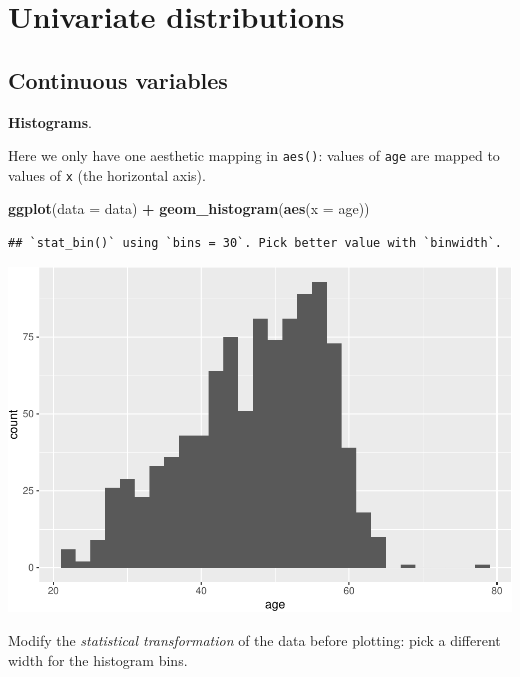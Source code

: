 \documentclass[
]{book}
\newenvironment{Shaded}{\begin{snugshade}}{\end{snugshade}}
\newcommand{\AttributeTok}[1]{\textcolor[rgb]{0.13,0.29,0.53}{#1}}
\newcommand{\FunctionTok}[1]{\textcolor[rgb]{0.13,0.29,0.53}{\textbf{#1}}}
\newcommand{\NormalTok}[1]{#1}
\newcommand{\SpecialCharTok}[1]{\textcolor[rgb]{0.81,0.36,0.00}{\textbf{#1}}}
\begin{document}
\hypertarget{univariate-distributions}{%
\section{Univariate distributions}\label{univariate-distributions}}

\hypertarget{continuous-variables}{%
\subsection{Continuous variables}\label{continuous-variables}}

\textbf{Histograms}.

Here we only have one aesthetic mapping in \texttt{aes()}: values of \texttt{age} are mapped to values of \texttt{x} (the horizontal axis).

\begin{Shaded}
\begin{Highlighting}[]
\FunctionTok{ggplot}\NormalTok{(}\AttributeTok{data =}\NormalTok{ data) }\SpecialCharTok{+}
  \FunctionTok{geom\_histogram}\NormalTok{(}\FunctionTok{aes}\NormalTok{(}\AttributeTok{x =}\NormalTok{ age))}
\end{Highlighting}
\end{Shaded}

\begin{verbatim}
## `stat_bin()` using `bins = 30`. Pick better value with `binwidth`.
\end{verbatim}

\includegraphics{R-for-social-research-and-business-analytics_files/figure-latex/unnamed-chunk-17-1.pdf}

Modify the \emph{statistical transformation} of the data before plotting: pick a different width for the histogram bins.
\end{document}
